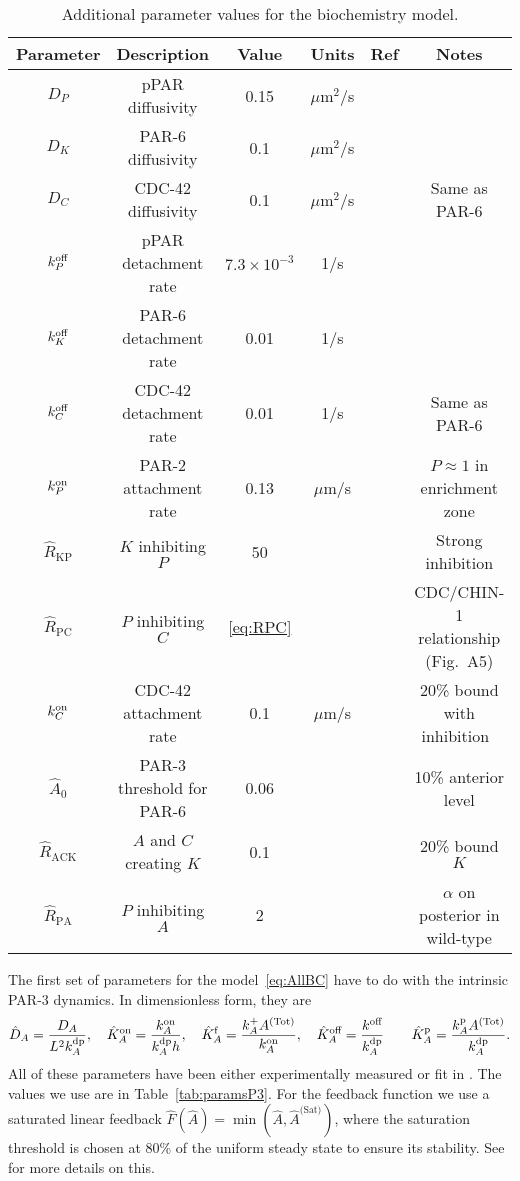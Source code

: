 \documentclass[11pt]{article}
\newcommand{\6}[1]{#1_{\text{6}}}
\newcommand{\3}[1]{#1_{\text{3}}}
\newcommand{\Tot}[1]{#1^\text{(Tot)}}
\newcommand{\Sat}[1]{#1^\text{(Sat)}}
\newcommand{\A}[1]{#1_A}
\begin{document}
\begin{table}
\begin{small}
\centering
\begin{tabular}{|c|c|c|c|c|c|}\hline
Parameter & Description & Value & Units & Ref & Notes \\ \hline
$D_P$ & pPAR diffusivity & 0.15 & $\mu$m$^2$/s & \cite{goehring2011polarization}&  \\ 
$D_K$ & PAR-6 diffusivity & 0.1 & $\mu$m$^2$/s & \cite{robin2014single}&  \\ 
$D_C$ & CDC-42 diffusivity & 0.1 & $\mu$m$^2$/s && Same as PAR-6 \\ 
$k^\text{off}_P$ & pPAR detachment rate & $7.3 \times 10^{-3}$ & 1/s & \cite{goehring2011polarization}&  \\  
$k^\text{off}_K$ & PAR-6 detachment rate & 0.01 & 1/s & \cite{robin2014single}&  \\  
$k^\text{off}_C$ & CDC-42 detachment rate & 0.01 & 1/s & &  Same as PAR-6\\  \hline
$k^\text{on}_P$ & PAR-2 attachment rate & 0.13 & $\mu$m/s & \cite{gross2019guiding} & $P \approx 1$ in enrichment zone\\
$\hat{R}_\text{KP}$ & $K$ inhibiting $P$ &50  &  &  & Strong inhibition\\
$\hat R_\text{PC}$ & $P$ inhibiting $C$ & \eqref{eq:RPC}  & & \cite{sailer2015dynamic} & CDC/CHIN-1 relationship (Fig.\ A5)\\ 
$k^\text{on}_C$ & CDC-42 attachment rate & 0.1 & $\mu$m/s & & 20\% bound with inhibition\ \\ 
$\hat A_0$ & PAR-3 threshold for PAR-6 & 0.06&  & \cite{sailer2015dynamic}& 10\% anterior level \\
$\hat{R}_\text{ACK}$ & $A$ and $C$ creating $K$ & 0.1  &  &  & 20\% bound $K$\\
$\hat{R}_\text{PA}$ & $P$ inhibiting $A$ & 2  &  &  & $\alpha$ on posterior in wild-type\\ \hline
\end{tabular}
\caption{\label{tab:paramsBC}Additional parameter values for the biochemistry model.}
\end{small}
\end{table}

The first set of parameters for the model\ \eqref{eq:AllBC} have to do with the intrinsic PAR-3 dynamics. In dimensionless form, they are 
\begin{equation*}
\DhatA =\frac{D_A}{L^2 \A{\kdp}}, \quad \KhatonA=\frac{\A{\kon}}{\A{\kdp} h }, \quad \KhatfA = \frac{\A{\kf}\Tot{A}}{\A{\kon}}, \quad  \KhatoffA = \frac{\koff}{\A{\kdp}} \qquad \KhatpA = \frac{\A{\kp} \Tot{A}}{\A{\kdp}}.
\end{equation*}
All of these parameters have been either experimentally measured or fit in \cite{lang2023oligomerization}. The values we use are in Table\ \ref{tab:paramsP3}. For the feedback function we use a saturated linear feedback $\hat F(\hat A) = \min\left(\hat A, \Sat{\hat A}\right)$, where the saturation threshold is chosen at 80\% of the uniform steady state to ensure its stability. See \cite{lang2023oligomerization} for more details on this. 
\end{document}
